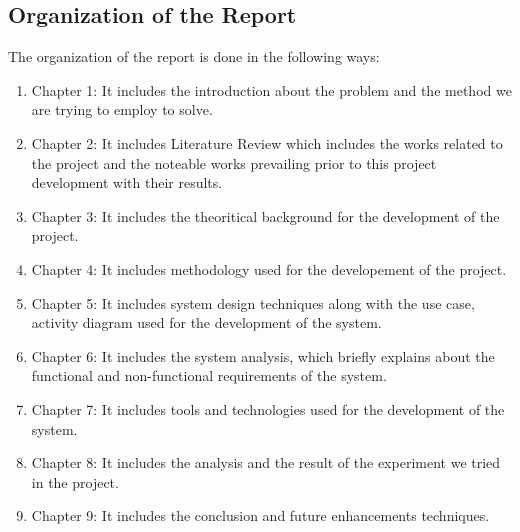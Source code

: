 \subsection{Organization of the Report}
The organization of the report is done in the following ways:
\begin{enumerate}
\item Chapter 1: It includes the introduction about the problem and the method we are trying to employ to solve. 
\item Chapter 2: It includes Literature Review which includes the works related to the project and the noteable works prevailing prior to this project development with their results.
\item Chapter 3: It includes the theoritical background for the development of the project.
\item Chapter 4: It includes methodology used for the developement of the project.
\item Chapter 5: It includes system design techniques along with the use case, activity diagram used for the development of the system.
\item Chapter 6: It includes the system analysis, which briefly explains about the functional and non-functional requirements of the system.
\item Chapter 7: It includes tools and technologies used for the development of the system.
\item Chapter 8: It includes the analysis and the result of the experiment we tried in the project.
\item Chapter 9: It includes the conclusion and future enhancements techniques.
\end{enumerate}
